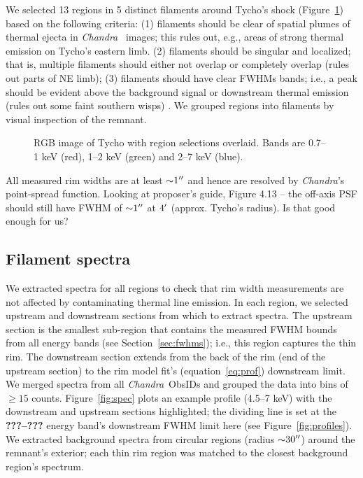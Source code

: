 \documentclass[iop, apj, numberedappendix, twocolappendix]{emulateapj}
\newcommand*{\abt}{\mathord{\sim}} %
\newcommand*{\Chandra}{\textit{Chandra}\ }
\begin{document}
We selected 13 regions in 5 distinct filaments around Tycho's shock
(Figure~\ref{fig:snr}) based on the following criteria:
(1) filaments should be clear of spatial plumes of thermal ejecta in \Chandra
images; this rules out, e.g., areas of strong thermal emission on Tycho's eastern limb.
(2) filaments should be singular and localized; that is, multiple filaments
should either not overlap or completely overlap (rules out parts of NE limb);
(3) filaments should have clear FWHMs bands; i.e., a peak should be evident
above the background signal or downstream thermal emission (rules out some
faint southern wisps) .
We grouped regions into filaments by visual inspection of the remnant.

\begin{figure}
    \centering
    \caption{RGB image of Tycho with region selections overlaid.  Bands are
    0.7--1 keV (red), 1--2 keV (green) and 2--7 keV (blue).
    }
    \label{fig:snr}
\end{figure}

All measured rim widths are at least $\abt 1\arcsec$ and hence are resolved by
\textit{Chandra}'s point-spread function.
Looking at proposer's guide, Figure 4.13 -- the off-axis PSF should
still have FWHM of $\abt 1\arcsec$ at $4\mbox{$^\prime$}$ (approx. Tycho's radius).
Is that good enough for us?

\subsection{Filament spectra}
\label{sec:spec}

We extracted spectra for all regions to check that rim width measurements are
not affected by contaminating thermal line emission.  In each region, we
selected upstream and downstream sections from which to extract spectra.  The
upstream section is the smallest sub-region that contains the measured FWHM
bounds from all energy bands (see Section~\ref{sec:fwhms}); i.e., this region
captures the thin rim.  The downstream section extends from the back of the rim
(end of the upstream section) to the rim model fit's (equation~\eqref{eq:prof})
downstream limit.  We merged spectra from all \Chandra ObsIDs and grouped the
data into bins of $\geq 15$ counts.  Figure~\ref{fig:spec} plots an example
profile (4.5--7 keV) with the downstream and upstream sections highlighted; the
dividing line is set at the \textbf{???--???} energy band's downstream FWHM
limit here (see Figure~\ref{fig:profiles}).
We extracted background spectra from circular regions (radius $\abt 30\arcsec$)
around the remnant's exterior; each thin rim region was matched to the closest
background region's spectrum.
\end{document}
